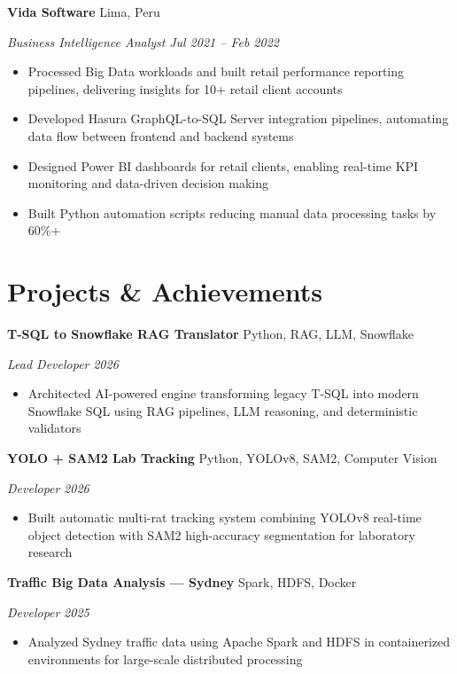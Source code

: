 \documentclass[11pt,letterpaper]{article}
\newcommand{\entry}[4]{%
  \noindent\textbf{#1} \hfill #2 \par\nopagebreak
  \textit{#3} \hfill \textit{#4} \par\nopagebreak
}
\begin{document}
\entry{Vida Software}{Lima, Peru}{Business Intelligence Analyst}{Jul 2021 -- Feb 2022}
\begin{itemize}
  \item Processed Big Data workloads and built retail performance reporting pipelines, delivering insights for 10+ retail client accounts
  \item Developed Hasura GraphQL-to-SQL Server integration pipelines, automating data flow between frontend and backend systems
  \item Designed Power BI dashboards for retail clients, enabling real-time KPI monitoring and data-driven decision making
  \item Built Python automation scripts reducing manual data processing tasks by 60\%+
\end{itemize}
\vspace{0.3em}

\section{Projects \& Achievements}

\entry{T-SQL to Snowflake RAG Translator}{Python, RAG, LLM, Snowflake}{Lead Developer}{2026}
\begin{itemize}
  \item Architected AI-powered engine transforming legacy T-SQL into modern Snowflake SQL using RAG pipelines, LLM reasoning, and deterministic validators
\end{itemize}
\vspace{0.3em}

\entry{YOLO + SAM2 Lab Tracking}{Python, YOLOv8, SAM2, Computer Vision}{Developer}{2026}
\begin{itemize}
  \item Built automatic multi-rat tracking system combining YOLOv8 real-time object detection with SAM2 high-accuracy segmentation for laboratory research
\end{itemize}
\vspace{0.3em}

\entry{Traffic Big Data Analysis — Sydney}{Spark, HDFS, Docker}{Developer}{2025}
\begin{itemize}
  \item Analyzed Sydney traffic data using Apache Spark and HDFS in containerized environments for large-scale distributed processing
\end{itemize}
\vspace{0.3em}
\end{document}
